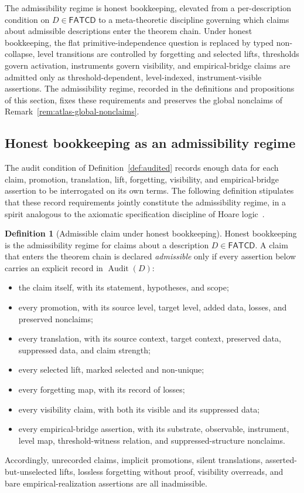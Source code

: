 \documentclass[11pt]{article}
\theoremstyle{definition}
\newtheorem{definition}[theorem]{Definition}
\newcommand{\FATCD}{\ensuremath{\mathsf{FATCD}}}
\newcommand{\Audit}[1]{\ensuremath{\operatorname{Audit}\!\left(#1\right)}}
\begin{document}
The admissibility regime is honest bookkeeping, elevated from a
per-description condition on \(D \in \FATCD{}\) to a meta-theoretic
discipline governing which claims about admissible descriptions enter
the theorem chain. Under honest bookkeeping, the flat
primitive-independence question is replaced by typed non-collapse,
level transitions are controlled by forgetting and selected lifts,
thresholds govern activation, instruments govern visibility, and
empirical-bridge claims are admitted only as threshold-dependent,
level-indexed, instrument-visible assertions. The admissibility
regime, recorded in the definitions and propositions of this section,
fixes these requirements and preserves the global nonclaims of
Remark~\ref{rem:atlas-global-nonclaims}.

\subsection{Honest bookkeeping as an admissibility regime}\label{subsec:honest-bookkeeping}

The audit condition of Definition~\ref{def:audited} records enough
data for each claim, promotion, translation, lift, forgetting,
visibility, and empirical-bridge assertion to be interrogated on its
own terms. The following definition stipulates that these record
requirements jointly constitute the admissibility regime, in a spirit
analogous to the axiomatic specification discipline of Hoare
logic~\citep{Hoare1969}.

\begin{definition}[Admissible claim under honest bookkeeping]\label{prop:honest-bookkeeping}
Honest bookkeeping is the admissibility regime for claims about a
description \(D \in \FATCD{}\). A claim that enters the theorem chain is
declared \emph{admissible} only if every assertion below carries an
explicit record in \(\Audit{D}\):
\begin{itemize}[topsep=2pt,itemsep=1pt]
  \item the claim itself, with its statement, hypotheses, and scope;
  \item every promotion, with its source level, target level, added data,
    losses, and preserved nonclaims;
  \item every translation, with its source context, target context,
    preserved data, suppressed data, and claim strength;
  \item every selected lift, marked selected and non-unique;
  \item every forgetting map, with its record of losses;
  \item every visibility claim, with both its visible and its suppressed
    data;
  \item every empirical-bridge assertion, with its substrate, observable,
    instrument, level map, threshold-witness relation, and
    suppressed-structure nonclaims.
\end{itemize}
Accordingly, unrecorded claims, implicit promotions, silent translations,
asserted-but-unselected lifts, lossless forgetting without proof,
visibility overreads, and bare empirical-realization assertions are all
inadmissible.
\end{definition}
\end{document}
